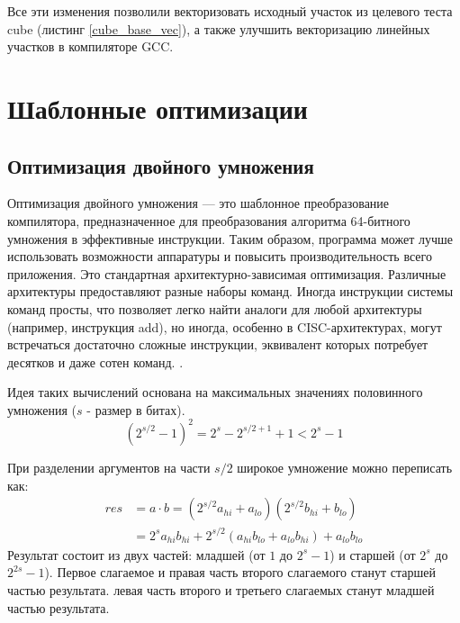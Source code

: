 Все эти изменения позволили векторизовать исходный участок из целевого теста cube (листинг \ref{cube_base_vec}), а также улучшить векторизацию линейных участков в компиляторе GCC.


\section{Шаблонные оптимизации}\label{sec:ch2/sect2}
\subsection{Оптимизация двойного умножения}
Оптимизация двойного умножения — это шаблонное преобразование компилятора, предназначенное для преобразования алгоритма 64-битного умножения в  эффективные инструкции. Таким образом, программа может лучше использовать возможности аппаратуры и повысить производительность всего приложения. Это стандартная архитектурно-зависимая оптимизация. Различные архитектуры предоставляют разные наборы команд. Иногда инструкции системы команд просты, что позволяет легко найти аналоги для любой архитектуры (например, инструкция add), но иногда, особенно в CISC-архитектурах, могут встречаться достаточно сложные инструкции, эквивалент которых потребует десятков и даже сотен команд.  \cite{bansal2021reduced, isen2009tale}.


Идея таких вычислений основана на максимальных значениях половинного умножения ($s$ - размер в битах).
\begin{equation*} \label{eq1}
	\left(2^{s/2}-1\right)^2=2^s-2^{s/2+1}+1<2^s-1
\end{equation*}

При разделении аргументов на части $s/2$ широкое умножение можно переписать как:
\begin{equation*} \label{eq2}
	\begin{split}
		res& =a\cdot b =\left(2^{s/2}a_{hi}+a_{lo}\right)\left(2^{s/2}b_{hi}+b_{lo}\right) \\
		& =2^sa_{hi}b_{hi}+2^{s/2}\left(a_{hi}b_{lo}+a_{lo}b_{hi}\right)+a_{lo}b_{lo}  
	\end{split}
\end{equation*}
Результат состоит из двух частей: младшей (от $1$ до $2^s - 1$) и старшей (от $2^s$ до $2^{2s} -1$). Первое слагаемое  и правая часть второго слагаемого станут старшей частью результата. левая часть второго и третьего слагаемых станут младшей частью результата.


